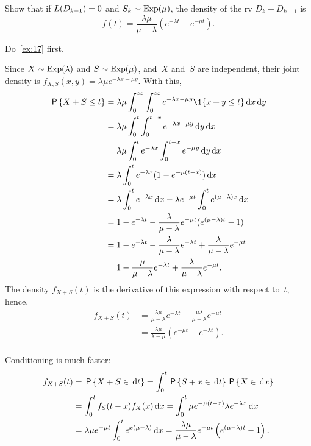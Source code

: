 \documentclass[stochastic-or.tex]{subfiles}
\begin{document}
\begin{exercise}\label{ex:46}
Show that if $L(D_{k-1}) = 0$ and $S_k \sim\mathrm{Exp}(\mu)$,  the density of the rv $D_{k} - D_{k-1}$ is
 \begin{equation*}
 f(t) = \frac{\lambda \mu}{\mu-\lambda} (e^{-\lambda t} - e^{-\mu t}).
 \end{equation*}
\begin{hint}
  Do~\cref{ex:17} first.
\end{hint}
\begin{solution}
Since $X\sim \mathrm{Exp}(\lambda)$ and $S\sim\mathrm{Exp}(\mu)$, and~$X$ and~$S$ are independent, their joint density is $f_{X,S}(x,y) = \lambda \mu e^{-\lambda x - \mu y}$. With this,
 \begin{align*}
\P{X+S\leq t }
&= \lambda \mu \int_0^\infty \int_0^\infty e^{-\lambda x - \mu y} \1{x+y\leq t} \d x \d y \\
&= \lambda \mu \int_0^t \int_0^{t-x} e^{-\lambda x - \mu y} \d y \d x \\
&= \lambda \mu \int_0^t e^{-\lambda x} \int_0^{t-x} e^{- \mu y} \d y \d x \\
&= \lambda \int_0^t e^{-\lambda x} (1-e^{- \mu (t-x)} ) \d x \\
&= \lambda \int_0^t e^{-\lambda x} \d x - \lambda e^{-\mu t} \int_0^t e^{(\mu-\lambda) x} \d x \\
&= 1- e^{-\lambda t} - \frac{\lambda}{\mu-\lambda} e^{-\mu t} ( e^{(\mu-\lambda) t} -1) \\
&= 1- e^{-\lambda t} - \frac{\lambda}{\mu-\lambda} e^{-\lambda t} + \frac{\lambda}{\mu-\lambda} e^{-\mu t} \\
&= 1 - \frac{\mu}{\mu-\lambda} e^{-\lambda t} + \frac{\lambda}{\mu-\lambda} e^{-\mu t}. \\
 \end{align*}
The density $f_{X+S}(t)$ is the derivative of this expression with respect to~$t$, hence,
\begin{align*}
 f_{X+S}(t)
&= \frac{\lambda\mu}{\mu-\lambda} e^{-\lambda t} - \frac{\mu \lambda}{\mu-\lambda} e^{-\mu t} \\
&= \frac{\lambda\mu}{\lambda -\mu}(e^{-\mu t} - e^{-\lambda t}). \\
\end{align*}

Conditioning is much faster:
 \begin{align*}
 f_{X+S}(t)
&= \,\mathsf{P}\left\{X+S\in \,\textrm{d}t\right\}
= \int_0^t \,\mathsf{P}\left\{S+x\in \,\textrm{d}t\right\}\,\mathsf{P}\left\{X\in \,\textrm{d}x\right\} \\
&=\int_0^t f_S(t-x) f_X(x) \,\textrm{d}x
 = \int_0^t \mu e^{-\mu(t-x)} \lambda e^{-\lambda x} \,\textrm{d}x \\
 &= \lambda \mu e^{-\mu t} \int_0^t e^{x(\mu-\lambda)} \,\textrm{d}x = \frac{\lambda \mu}{\mu - \lambda}e^{-\mu t}\left(e^{(\mu -\lambda)t} - 1\right).
 \end{align*}
\end{solution}
\end{exercise}
\end{document}
